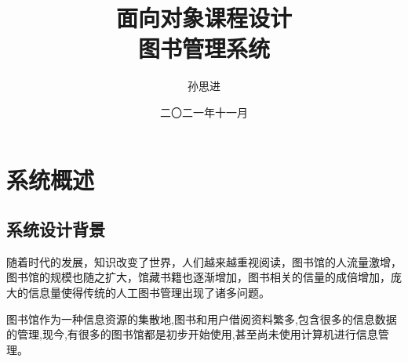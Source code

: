 \documentclass[forprint]{shmtu}
\begin{document}

\miji{ }                                      %

\title{面向对象课程设计\\图书管理系统}
\author{孙思进}                            %
\date{二〇二一年十一月}                    %

\maketitle
\frontmatter
{}              %
\tableofcontents
\mainmatter %

\chapter{系统概述}
\section{系统设计背景}
随着时代的发展，知识改变了世界，人们越来越重视阅读，图书馆的人流量激增，图书馆的规模也随之扩大，馆藏书籍也逐渐增加，图书相关的信量的成倍增加，庞大的信息量使得传统的人工图书管理出现了诸多问题。

图书馆作为一种信息资源的集散地,图书和用户借阅资料繁多,包含很多的信息数据的管理,现今,有很多的图书馆都是初步开始使用,甚至尚未使用计算机进行信息管理。
\end{document}
